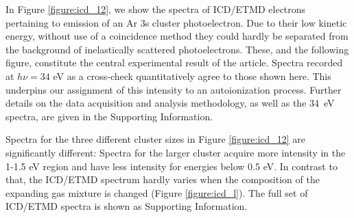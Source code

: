 %
In Figure \ref{figure:icd_12}, we show the spectra of ICD/ETMD electrons pertaining to emission of an Ar 3s cluster photoelectron. 
Due to their low kinetic energy, without use of a coincidence method they could hardly be separated from the background of inelastically scattered photoelectrons.\cite{mucke}
These, and the following figure, constitute the central experimental result of the article.
Spectra recorded at $h\nu = 34$ eV as a cross-check quantitatively agree to those shown here.
This underpins our assignment of this intensity to an autoionization process.
Further details on the data acquisition and analysis methodology, as well as the 34~eV spectra, are given in the Supporting Information.

Spectra for the three different cluster sizes in Figure \ref{figure:icd_12} are significantly different: Spectra for the larger cluster acquire more intensity in the 1-1.5 eV region and have less intensity for energies below 0.5 eV.
In contrast to that, the ICD/ETMD spectrum hardly varies when the composition of the expanding gas mixture is changed (Figure \ref{figure:icd_l}).
The full set of ICD/ETMD spectra is shown as Supporting Information.


